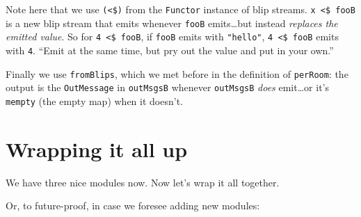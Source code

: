 \documentclass[]{article}
\newenvironment{Shaded}{}{}
\newcommand{\CommentTok}[1]{\textcolor[rgb]{0.38,0.63,0.69}{\textit{#1}}}
\newcommand{\DataTypeTok}[1]{\textcolor[rgb]{0.56,0.13,0.00}{#1}}
\newcommand{\FunctionTok}[1]{\textcolor[rgb]{0.02,0.16,0.49}{#1}}
\newcommand{\NormalTok}[1]{#1}
\newcommand{\OperatorTok}[1]{\textcolor[rgb]{0.40,0.40,0.40}{#1}}
\newcommand{\OtherTok}[1]{\textcolor[rgb]{0.00,0.44,0.13}{#1}}
\newcommand{\StringTok}[1]{\textcolor[rgb]{0.25,0.44,0.63}{#1}}
\begin{document}
Note here that we use \texttt{(\textless{}\$)} from the \texttt{Functor}
instance of blip streams. \texttt{x\ \textless{}\$\ fooB} is a new blip stream
that emits whenever \texttt{fooB} emits\ldots but instead \emph{replaces the
emitted value}. So for \texttt{4\ \textless{}\$\ fooB}, if \texttt{fooB} emits
with \texttt{"hello"}, \texttt{4\ \textless{}\$\ fooB} emits with \texttt{4}.
``Emit at the same time, but pry out the value and put in your own.''

Finally we use \texttt{fromBlips}, which we met before in the definition of
\texttt{perRoom}: the output is the \texttt{OutMessage} in \texttt{outMsgsB}
whenever \texttt{outMsgsB} \emph{does} emit\ldots or it's \texttt{mempty} (the
empty map) when it doesn't.

\section{Wrapping it all up}\label{wrapping-it-all-up}

We have three nice modules now. Now let's wrap it all together.

\begin{Shaded}
\end{Shaded}

Or, to future-proof, in case we foresee adding new modules:

\begin{Shaded}
\end{Shaded}
\end{document}
